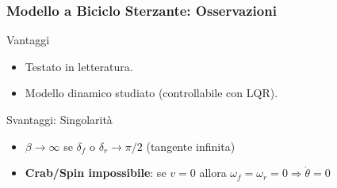 \begin{frame}
    \frametitle{Modello a Biciclo Sterzante: Osservazioni}
    \begin{block}{Vantaggi}
        \begin{itemize}
            \item Testato in letteratura.
            \item Modello dinamico studiato (controllabile con LQR).
        \end{itemize}
    \end{block}
    \begin{alertblock}{Svantaggi: Singolarità}
        \begin{itemize}
            \item $\beta \rightarrow \infty$ se $\delta_f$ o $\delta_r \rightarrow \pi/2$ (tangente infinita)
            \item \textbf{Crab/Spin impossibile}: se $v=0$ allora $\omega_f = \omega_r = 0 \Rightarrow \dot{\theta}=0$
        \end{itemize}
    \end{alertblock}
\end{frame}





